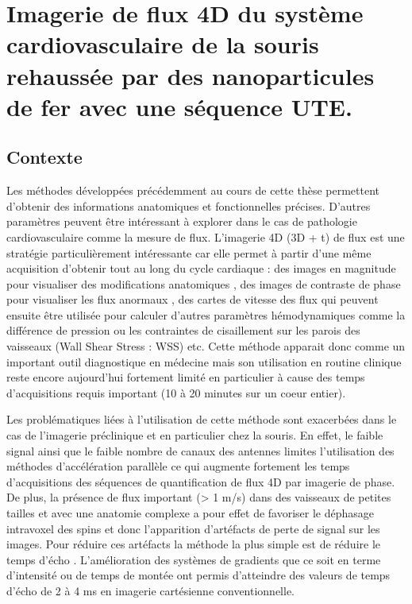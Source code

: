 \chapter{Imagerie de flux 4D du système cardiovasculaire de la souris rehaussée par des nanoparticules de fer avec une séquence UTE.}
\setlength{\footskip}{50pt}
\label{Chap6}
\section{Contexte}

Les méthodes développées précédemment au cours de cette thèse permettent d'obtenir des informations anatomiques et fonctionnelles précises. D'autres paramètres peuvent être intéressant à explorer dans le cas de pathologie cardiovasculaire comme la mesure de flux. L'imagerie 4D (3D + t) de flux est une stratégie particulièrement intéressante car elle permet à partir d'une même acquisition d'obtenir tout au long du cycle cardiaque : des images en magnitude pour visualiser des modifications anatomiques  \cite{Eriksson:2013aa}, des images de contraste de phase pour visualiser les flux anormaux \cite{Velikina:2010hc}, des cartes de vitesse des flux \cite{Garcia:2014aa} qui peuvent ensuite être utilisée pour calculer d'autres paramètres hémodynamiques comme la différence de pression \cite{Tyszka:2000aa,bock2011vivo} ou les contraintes de cisaillement sur les parois des vaisseaux (Wall Shear Stress : WSS)\cite{Zhao:2009ng} etc. Cette méthode apparait donc comme un important outil diagnostique en médecine mais son utilisation en routine clinique reste encore aujourd'hui fortement limité en particulier à cause des temps d'acquisitions requis important (10 à 20 minutes sur un coeur entier).

Les problématiques liées à l'utilisation de cette méthode sont exacerbées dans le cas de l'imagerie préclinique et en particulier chez la souris. En effet, le faible signal ainsi que le faible nombre de canaux des antennes limites l'utilisation des méthodes d'accélération parallèle ce qui augmente fortement les temps d'acquisitions des séquences de quantification de flux 4D par imagerie de phase. De plus, la présence de flux important (> 1 m/s) dans des vaisseaux de petites tailles et avec une anatomie complexe a pour effet de favoriser le déphasage intravoxel des spins et donc l'apparition d'artéfacts de perte de signal sur les images. Pour réduire ces artéfacts la méthode la plus simple est de réduire le temps d'écho \cite{staahlberg1994pulse,OBrien:2008aa}. L'amélioration des systèmes de gradients que ce soit en terme d'intensité ou de temps de montée ont permis d'atteindre des valeurs de temps d'écho de 2 à 4 ms en imagerie cartésienne conventionnelle.

